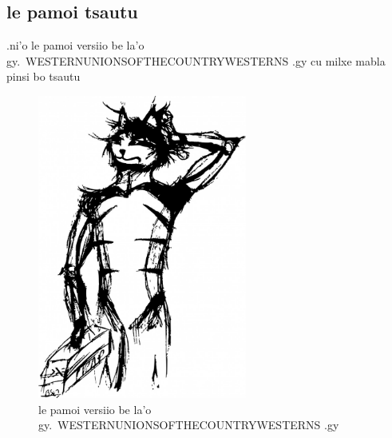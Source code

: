 \documentclass{report}
\newcommand\imageheight{10cm}
\begin{document}
\subsection{le pamoi tsautu}
.ni'o le pamoi versiio be la'o gy.\ WESTERNUNIONSOFTHECOUNTRYWESTERNS .gy cu milxe mabla pinsi bo tsautu
\begin{figure}[ht]
	\centering
	\includegraphics[height=\imageheight]{50x/toolbox/s1v1.jpg}
	\caption[center]{le pamoi versiio be la'o gy.\ WESTERNUNIONSOFTHECOUNTRYWESTERNS .gy}
\end{figure}
\end{document}
